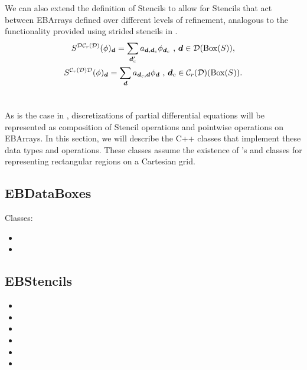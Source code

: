 \documentclass[12pt]{article}
\newcommand{\mcl}[1]{{\mathcal{#1}}}
\newcommand{\MBox}{{\rm{Box}}}
\newcommand{\dgen}{{\mbf{d}}}
\begin{document}
We can also extend the definition of Stencils to allow for Stencils that act between EBArrays defined over different levels of refinement, analogous to the functionality provided using strided stencils in .
\begin{gather*}
S^{\mcl{D}\mcl{C}_r(\mcl{D})}(\phi)_{\dgen} =\sum \limits_{\dgen_c '} a_{\dgen,\dgen_c} \phi_{\dgen_c  } \cma \dgen \in \mcl{D}(\MBox(S)), 
\\ S^{\mcl{C}_r(\mcl{D}) \mcl{D}}(\phi)_{\dgen} = \sum \limits_{\dgen} a_{\dgen_c,\dgen} \phi_{\dgen } \cma \dgen_c \in \mcl{C}_r(\mcl{D})(\MBox(S)).
\end{gather*}
\section{} 

As is the case in , discretizations of partial differential equations will be represented as composition of Stencil operations and pointwise operations on EBArrays. In this section, we will describe the C++ classes that implement these data types and operations. These classes assume the existence of 's  and  classes for representing rectangular regions on a Cartesian grid.

\subsection{}

\subsection{EBDataBoxes}
Classes:
\begin{itemize}
\item
{}
\item
{}
\end{itemize}

\subsection{EBStencils}
\begin{itemize}
\item
{}
\item
{}
\item
{}
\item
{}
\item
{}
\item
{}
\end{itemize}
\end{document}
